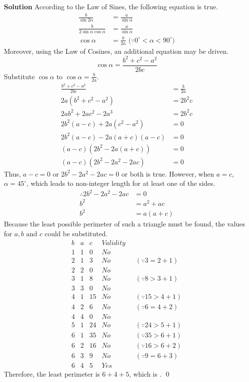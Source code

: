 \documentclass{article}
\newenvironment{solution}{\begin{trivlist}\item[]
{\bf Solution}}{\qed \end{trivlist}}
\begin{document}
\begin{solution}
According to the Law of Sines, the following equation is true.
\begin{align*}
   \frac{b}{\sin{2\alpha}}
   &= \frac{a}{\sin\alpha} \\
   \frac{b}{2 \sin\alpha \cos\alpha}
   &= \frac{a}{\sin\alpha} \\
   \cos\alpha &= \frac{b}{2a}
   \text{ ($\because 0^{\circ} < \alpha < 90^{\circ}$)}
\end{align*}
Moreover, using the Law of Cosines, an additional
equation may be driven.
\[
\cos\alpha = \frac{b^2 + c^2 - a^2}{2bc}
\]
Substitute $\cos\alpha$ to $\cos\alpha = \frac{b}{2a}$.
\begin{align*}
    \frac{b^2 + c^2 - a^2}{2bc} &=\frac{b}{2a} \\
    2a(b^2 + c^2 - a^2) &= 2b^2 c \\
    2ab^2 + 2ac^2 - 2a^3 &= 2b^2 c \\
    2b^2(a-c) + 2a(c^2-a^2) &= 0 \\
    2b^2(a-c) - 2a(a+c)(a-c) &= 0 \\
    (a - c)(2b^2 - 2a(a + c)) &= 0 \\
    (a - c)(2b^2 - 2a^2 - 2ac) &= 0
\end{align*}
Thus, $a - c = 0$ or $2b^2 - 2a^2 - 2ac = 0$ or both
is true. However, when $a = c$, $\alpha = 45^{\circ}$,
which leads to non-integer length for at least one
of the sides.
\begin{align*}
    \therefore 2b^2 - 2a^2 - 2ac &= 0 \\
    b^2 &= a^2 + ac \\
    b^2 &= a(a + c)
\end{align*}
Because the least possible perimeter of such a
triangle must be found, the values for
$a, b \text{ and } c$ could be substituted.
\[
\begin{array}{ccc|cc}
    b & a & c & Validity \\
    \hline
    1 & 1 & 0 & No & \\
    2 & 1 & 3 & No & \text{ }(\because 3 = 2 + 1) \\
    2 & 2 & 0 & No & \\
    3 & 1 & 8 & No & \text{ }(\because 8 > 3 + 1) \\
    3 & 3 & 0 & No & \\
    4 & 1 & 15 & No & \text{ }(\because 15 > 4 + 1) \\
    4 & 2 & 6 & No & \text{ }(\because 6 = 4 + 2) \\
    4 & 4 & 0 & No & \\
    5 & 1 & 24 & No & \text{ }(\because 24 > 5 + 1) \\
    6 & 1 & 35 & No & \text{ }(\because 35 > 6 + 1) \\
    6 & 2 & 16 & No & \text{ }(\because 16 > 6 + 2) \\
    6 & 3 & 9 & No & \text{ }(\because 9 = 6 + 3)\\
    6 & 4 & 5 & Yes & 
\end{array}
\]
Therefore, the least perimeter is $6 + 4 + 5$,
which is .
\end{solution}
\end{document}
